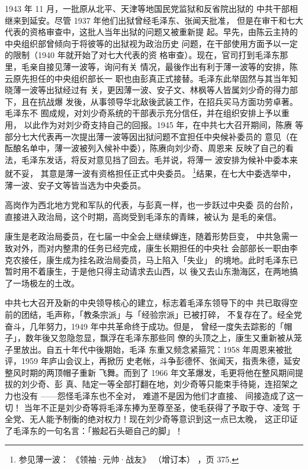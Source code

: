 1943 年 11 月，一批原从北平、天津等地国民党监狱和反省院出狱的
中共干部相继来到延安。尽管 1937 年他们出狱曾经毛泽东、张闻天批准，
但是在审干和七大代表的资格审查中，这批人当年出狱的问题又被重新提
起。早先，由陈云主持的中央组织部曾倾向于将彼等的出狱视为政治历史
问题，在干部使用方面予以一定的限制（1940 年就开始了对七大代表的资
格审查）。现在，官司打到毛泽东那里，毛亲自接见薄一波等，询问有关
情况，最後作出有利于薄一波等的安排，陈云原先担任的中央组织部长一
职也由彭真正式接替。毛泽东此举固然与其当年知晓薄一波等出狱经过有
关，更因薄一波、安子文、林枫等人皆属刘少奇的得力部下，且在抗战爆
发後，从事领导华北敌後武装工作，在招兵买马方面功劳卓著。毛泽东不
囿成规，对刘少奇系统的干部表示充分信任，并在组织安排上予以重用，
以此作为对刘少奇支持自己的回报。1945 年，在中共七大召开期间，陈赓
等部分七大代表再一次提出薄一波等因出狱问题不宜担任中央候补委员的
意见（在酝酿名单中，薄一波被列入候补中委），陈赓向刘少奇、周恩来
反映了自己的看法，毛泽东发话，将反对意见挡了回去。毛并说，将薄一
波安排为候补中委本来就不妥，
其意是薄一波有资格担任正式中央委员。
\footnote{参见薄一波：
《领袖·元帅·战友》
（增订本）
，页 375.}结果，在七大中委选举中，薄一波、安子文等皆当选为中央委员。

高岗作为西北地方党和军队的代表，与彭真一样，也一步跃过中央委
员的台阶，直接进入政治局，这个时期，高岗受到毛泽东的青睐，被认为
是毛的亲信。

康生是老政治局委员，在七届一中全会上继续蝉连，随着形势巨变，
中共急需一致对外，而对内整肃的任务已经完成，康生长期担任的中央社
会部部长一职由李克农接任，康生成为挂名政治局委员，马上陷入「失业」
的境地。此时毛泽东已暂时用不着康生，于是他只得主动请求去山西，以
後又去山东渤海区，在两地搞了一场极左的土改。

中共七大召开及新的中央领导核心的建立，标志着毛泽东领导下的中
共已取得空前的团结，毛声称，「教条宗派」与「经验宗派」已被打碎，
不复存在了。经全党奋斗，几年努力，1949 年中共革命终于成功。但是，
曾经一度失去踪影的「帽子」，数年後又忽隐忽显，飘浮在毛泽东那些同
僚的头顶之上，康生又重新被从笼子里放出。自五十年代中後期始，毛泽
东重又频念紧箍咒：1958 年周恩来被批评，1959 年庐山会议上，再掀历
史老帐，斗争彭德怀、张闻天，指责朱德，延安整风时期的两顶帽子重新
飞舞。而到了 1966 年文革爆发，毛更将他在整风期间提拔的刘少奇、彭
真、陆定一等全部打翻在地，刘少奇等只能束手待毙，连招架之力也没有
——怨怪毛泽东也不全对，
难道不是因为他们才直接、
间接造成了这一切！
当年不正是刘少奇等将毛泽东捧为至尊至圣，使毛获得了予取于夺、凌驾
于全党、无人能予制衡的绝对权力！现在刘少奇等意识到这一点已太晚，
这正印证了毛泽东的一句名言：「搬起石头砸自己的脚」！
